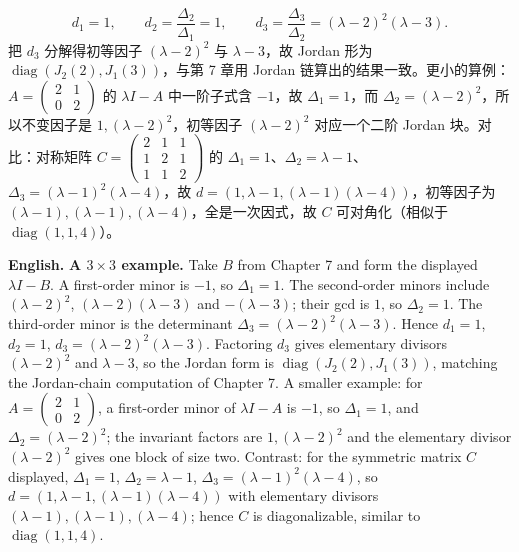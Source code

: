 \documentclass[UTF8,11pt,a4paper]{ctexart}
\newcommand{\EN}[1]{\par\noindent\textbf{English.} #1\par}
\begin{document}
\[
d_1=1,\qquad d_2=\frac{\Delta_2}{\Delta_1}=1,\qquad d_3=\frac{\Delta_3}{\Delta_2}=(\lambda-2)^2(\lambda-3).
\]
把 $d_3$ 分解得初等因子 $(\lambda-2)^2$ 与 $\lambda-3$，故 Jordan 形为 $\operatorname{diag}(J_2(2),J_1(3))$，与第 7 章用 Jordan 链算出的结果一致。更小的算例：$A=\left(\begin{smallmatrix}2&1\\0&2\end{smallmatrix}\right)$ 的 $\lambda I-A$ 中一阶子式含 $-1$，故 $\Delta_1=1$，而 $\Delta_2=(\lambda-2)^2$，所以不变因子是 $1,(\lambda-2)^2$，初等因子 $(\lambda-2)^2$ 对应一个二阶 Jordan 块。对比：对称矩阵 $C=\begin{pmatrix}2&1&1\\1&2&1\\1&1&2\end{pmatrix}$ 的 $\Delta_1=1$、$\Delta_2=\lambda-1$、$\Delta_3=(\lambda-1)^2(\lambda-4)$，故 $d=(1,\lambda-1,(\lambda-1)(\lambda-4))$，初等因子为 $(\lambda-1),(\lambda-1),(\lambda-4)$，全是一次因式，故 $C$ 可对角化（相似于 $\operatorname{diag}(1,1,4)$）。
\EN{\textbf{A $3\times3$ example.} Take $B$ from Chapter 7 and form the displayed $\lambda I-B$. A first-order minor is $-1$, so $\Delta_1=1$. The second-order minors include $(\lambda-2)^2$, $(\lambda-2)(\lambda-3)$ and $-(\lambda-3)$; their gcd is $1$, so $\Delta_2=1$. The third-order minor is the determinant $\Delta_3=(\lambda-2)^2(\lambda-3)$. Hence $d_1=1$, $d_2=1$, $d_3=(\lambda-2)^2(\lambda-3)$. Factoring $d_3$ gives elementary divisors $(\lambda-2)^2$ and $\lambda-3$, so the Jordan form is $\operatorname{diag}(J_2(2),J_1(3))$, matching the Jordan-chain computation of Chapter 7. A smaller example: for $A=\left(\begin{smallmatrix}2&1\\0&2\end{smallmatrix}\right)$, a first-order minor of $\lambda I-A$ is $-1$, so $\Delta_1=1$, and $\Delta_2=(\lambda-2)^2$; the invariant factors are $1,(\lambda-2)^2$ and the elementary divisor $(\lambda-2)^2$ gives one block of size two. Contrast: for the symmetric matrix $C$ displayed, $\Delta_1=1$, $\Delta_2=\lambda-1$, $\Delta_3=(\lambda-1)^2(\lambda-4)$, so $d=(1,\lambda-1,(\lambda-1)(\lambda-4))$ with elementary divisors $(\lambda-1),(\lambda-1),(\lambda-4)$; hence $C$ is diagonalizable, similar to $\operatorname{diag}(1,1,4)$.}
\end{document}
